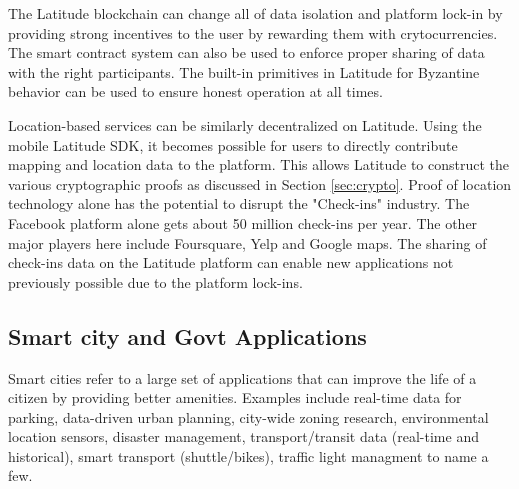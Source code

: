 The Latitude blockchain can change all of data isolation and platform lock-in by providing strong incentives to the user
by rewarding them with crytocurrencies. The smart contract system can also be used to enforce proper sharing of data
with the right participants. The built-in primitives in Latitude for Byzantine behavior can be used to ensure honest
operation at all times.

Location-based services can be similarly decentralized on Latitude. Using the mobile Latitude SDK, it becomes possible
for users to directly contribute mapping and location data to the platform. This allows Latitude to construct the
various cryptographic proofs as discussed in Section \ref{sec:crypto}. Proof of location technology alone has the
potential to disrupt the "Check-ins" industry. The Facebook platform alone gets about 50 million check-ins per year. The
other major players here include Foursquare, Yelp and Google maps. The sharing of check-ins data on the Latitude
platform can enable new applications not previously possible due to the platform lock-ins.

%
%
%
%
\subsection{Smart city and Govt Applications}

Smart cities refer to a large set of applications that can improve the life of a citizen by providing better amenities.
Examples include real-time data for parking, data-driven urban planning, city-wide zoning research,
environmental location sensors, disaster management, transport/transit data (real-time and historical), smart transport
(shuttle/bikes), traffic light managment to name a few.

